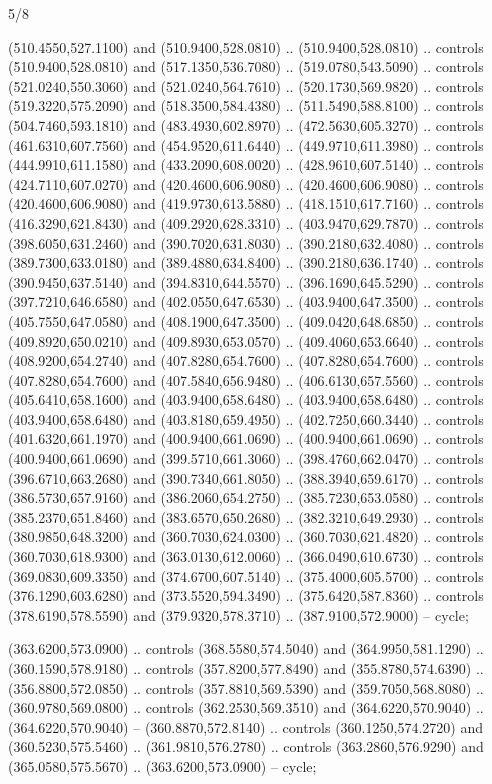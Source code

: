 \begin{flagdescription}{5/8}
\begin{scope}[shift={(m)}]
\begin{scope}[scale=\flagwidth/220,y=0.1mm, x=0.1mm, yscale=-1,shift={(-596,-360)}]
\begin{scope}[draw=black,line join=round,line cap=round,line width=0.381\lw]
\begin{scope}[fill=white,line width=1.143\lw]
  (510.4550,527.1100) and (510.9400,528.0810) .. (510.9400,528.0810) .. controls
  (510.9400,528.0810) and (517.1350,536.7080) .. (519.0780,543.5090) .. controls
  (521.0240,550.3060) and (521.0240,564.7610) .. (520.1730,569.9820) .. controls
  (519.3220,575.2090) and (518.3500,584.4380) .. (511.5490,588.8100) .. controls
  (504.7460,593.1810) and (483.4930,602.8970) .. (472.5630,605.3270) .. controls
  (461.6310,607.7560) and (454.9520,611.6440) .. (449.9710,611.3980) .. controls
  (444.9910,611.1580) and (433.2090,608.0020) .. (428.9610,607.5140) .. controls
  (424.7110,607.0270) and (420.4600,606.9080) .. (420.4600,606.9080) .. controls
  (420.4600,606.9080) and (419.9730,613.5880) .. (418.1510,617.7160) .. controls
  (416.3290,621.8430) and (409.2920,628.3310) .. (403.9470,629.7870) .. controls
  (398.6050,631.2460) and (390.7020,631.8030) .. (390.2180,632.4080) .. controls
  (389.7300,633.0180) and (389.4880,634.8400) .. (390.2180,636.1740) .. controls
  (390.9450,637.5140) and (394.8310,644.5570) .. (396.1690,645.5290) .. controls
  (397.7210,646.6580) and (402.0550,647.6530) .. (403.9400,647.3500) .. controls
  (405.7550,647.0580) and (408.1900,647.3500) .. (409.0420,648.6850) .. controls
  (409.8920,650.0210) and (409.8930,653.0570) .. (409.4060,653.6640) .. controls
  (408.9200,654.2740) and (407.8280,654.7600) .. (407.8280,654.7600) .. controls
  (407.8280,654.7600) and (407.5840,656.9480) .. (406.6130,657.5560) .. controls
  (405.6410,658.1600) and (403.9400,658.6480) .. (403.9400,658.6480) .. controls
  (403.9400,658.6480) and (403.8180,659.4950) .. (402.7250,660.3440) .. controls
  (401.6320,661.1970) and (400.9400,661.0690) .. (400.9400,661.0690) .. controls
  (400.9400,661.0690) and (399.5710,661.3060) .. (398.4760,662.0470) .. controls
  (396.6710,663.2680) and (390.7340,661.8050) .. (388.3940,659.6170) .. controls
  (386.5730,657.9160) and (386.2060,654.2750) .. (385.7230,653.0580) .. controls
  (385.2370,651.8460) and (383.6570,650.2680) .. (382.3210,649.2930) .. controls
  (380.9850,648.3200) and (360.7030,624.0300) .. (360.7030,621.4820) .. controls
  (360.7030,618.9300) and (363.0130,612.0060) .. (366.0490,610.6730) .. controls
  (369.0830,609.3350) and (374.6700,607.5140) .. (375.4000,605.5700) .. controls
  (376.1290,603.6280) and (373.5520,594.3490) .. (375.6420,587.8360) .. controls
  (378.6190,578.5590) and (379.9320,578.3710) .. (387.9100,572.9000) -- cycle;

 (363.6200,573.0900) .. controls (368.5580,574.5040) and
  (364.9950,581.1290) .. (360.1590,578.9180) .. controls (357.8200,577.8490) and
  (355.8780,574.6390) .. (356.8800,572.0850) .. controls (357.8810,569.5390) and
  (359.7050,568.8080) .. (360.9780,569.0800) .. controls (362.2530,569.3510) and
  (364.6220,570.9040) .. (364.6220,570.9040) -- (360.8870,572.8140) .. controls
  (360.1250,574.2720) and (360.5230,575.5460) .. (361.9810,576.2780) .. controls
  (363.2860,576.9290) and (365.0580,575.5670) .. (363.6200,573.0900) -- cycle;


\end{scope}
\end{scope}
\end{scope}
\end{scope}
\end{flagdescription}
